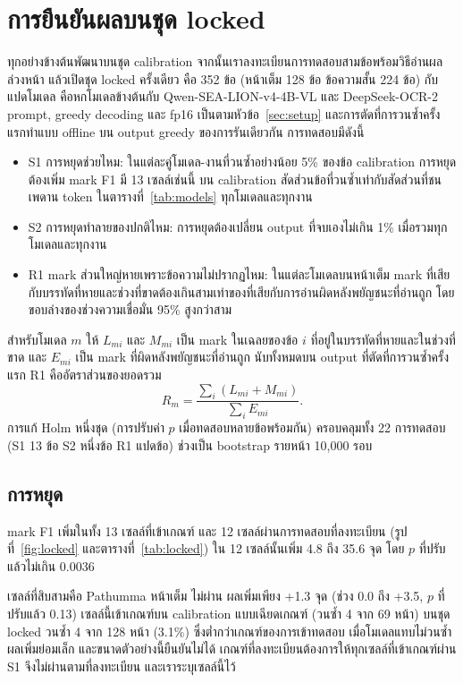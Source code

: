 \section{การยืนยันผลบนชุด locked}\label{sec:locked}
ทุกอย่างข้างต้นพัฒนาบนชุด calibration จากนั้นเราลงทะเบียนการทดสอบสามข้อพร้อมวิธีอ่านผลล่วงหน้า แล้วเปิดชุด locked ครั้งเดียว คือ 352 ข้อ (หน้าเต็ม 128 ข้อ ข้อความสั้น 224 ข้อ) กับแปดโมเดล คือหกโมเดลข้างต้นกับ Qwen-SEA-LION-v4-4B-VL และ DeepSeek-OCR-2 prompt, greedy decoding และ fp16 เป็นตามหัวข้อ~\ref{sec:setup} และการตัดที่การวนซ้ำครั้งแรกทำแบบ offline บน output greedy ของการรันเดียวกัน การทดสอบมีดังนี้
\begin{itemize}
\item S1 การหยุดช่วยไหม: ในแต่ละคู่โมเดล-งานที่วนซ้ำอย่างน้อย 5\% ของข้อ calibration การหยุดต้องเพิ่ม mark F1 มี 13 เซลล์เช่นนี้ บน calibration สัดส่วนข้อที่วนซ้ำเท่ากับสัดส่วนที่ชนเพดาน token ในตารางที่~\ref{tab:models} ทุกโมเดลและทุกงาน
\item S2 การหยุดทำลายของปกติไหม: การหยุดต้องเปลี่ยน output ที่จบเองไม่เกิน 1\% เมื่อรวมทุกโมเดลและทุกงาน
\item R1 mark ส่วนใหญ่หายเพราะข้อความไม่ปรากฏไหม: ในแต่ละโมเดลบนหน้าเต็ม mark ที่เสียกับบรรทัดที่หายและช่วงที่ขาดต้องเกินสามเท่าของที่เสียกับการอ่านผิดหลังพยัญชนะที่อ่านถูก โดยขอบล่างของช่วงความเชื่อมั่น 95\% สูงกว่าสาม
\end{itemize}
สำหรับโมเดล $m$ ให้ $L_{mi}$ และ $M_{mi}$ เป็น mark ในเฉลยของข้อ $i$ ที่อยู่ในบรรทัดที่หายและในช่วงที่ขาด และ $E_{mi}$ เป็น mark ที่ผิดหลังพยัญชนะที่อ่านถูก นับทั้งหมดบน output ที่ตัดที่การวนซ้ำครั้งแรก R1 คืออัตราส่วนของยอดรวม
\begin{equation}
R_m=\frac{\sum_i (L_{mi}+M_{mi})}{\sum_i E_{mi}}.
\end{equation}
การแก้ Holm หนึ่งชุด (การปรับค่า $p$ เมื่อทดสอบหลายข้อพร้อมกัน) ครอบคลุมทั้ง 22 การทดสอบ (S1 13 ข้อ S2 หนึ่งข้อ R1 แปดข้อ) ช่วงเป็น bootstrap รายหน้า 10,000 รอบ

\subsection{การหยุด}
mark F1 เพิ่มในทั้ง 13 เซลล์ที่เข้าเกณฑ์ และ 12 เซลล์ผ่านการทดสอบที่ลงทะเบียน (รูปที่~\ref{fig:locked} และตารางที่~\ref{tab:locked}) ใน 12 เซลล์นั้นเพิ่ม 4.8 ถึง 35.6 จุด โดย $p$ ที่ปรับแล้วไม่เกิน 0.0036

เซลล์ที่สิบสามคือ Pathumma หน้าเต็ม ไม่ผ่าน ผลเพิ่มเพียง +1.3 จุด (ช่วง 0.0 ถึง +3.5, $p$ ที่ปรับแล้ว 0.13) เซลล์นี้เข้าเกณฑ์บน calibration แบบเฉียดเกณฑ์ (วนซ้ำ 4 จาก 69 หน้า) บนชุด locked วนซ้ำ 4 จาก 128 หน้า (3.1\%) ซึ่งต่ำกว่าเกณฑ์ของการเข้าทดสอบ เมื่อโมเดลแทบไม่วนซ้ำ ผลเพิ่มย่อมเล็ก และขนาดตัวอย่างนี้ยืนยันไม่ได้ เกณฑ์ที่ลงทะเบียนต้องการให้ทุกเซลล์ที่เข้าเกณฑ์ผ่าน S1 จึงไม่ผ่านตามที่ลงทะเบียน และเราระบุเซลล์นี้ไว้

